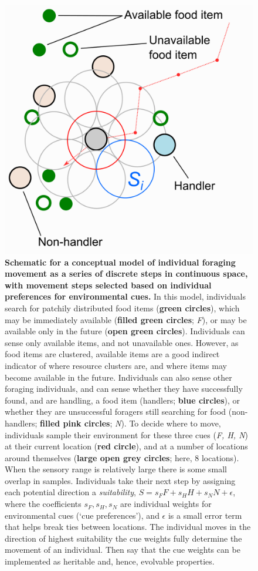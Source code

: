 \begin{interludeenv}
\begin{figure}[!h]
    \centering
    \includegraphics[width=0.9\linewidth]{figures/introduction/fig_schematic.png}
    \caption{
        \textbf{Schematic for a conceptual model of individual foraging movement as a series of discrete steps in continuous space, with movement steps selected based on individual preferences for environmental cues.} 
        In this model, individuals search for patchily distributed food items (\textbf{green circles}), which may be immediately available (\textbf{filled green circles}; \emph{F}), or may be available only in the future (\textbf{open green circles}). 
        Individuals can sense only available items, and not unavailable ones. However, as food items are clustered, available items are a good indirect indicator of where resource clusters are, and where items may become available in the future. 
        Individuals can also sense other foraging individuals, and can sense whether they have successfully found, and are handling, a food item (handlers; \textbf{blue circles}), or whether they are unsuccessful foragers still searching for food (non-handlers; \textbf{filled pink circles}; \emph{N}). 
        To decide where to move, individuals sample their environment for these three cues (\emph{F, H, N}) at their current location (\textbf{red circle}), and at a number of locations around themselves (\textbf{large open grey circles}; here, 8 locations). 
        When the sensory range is relatively large there is some small overlap in samples. 
        Individuals take their next step by assigning each potential direction a \emph{suitability}, $S = s_FF + s_HH + s_NN + \epsilon$, where the coefficients $s_F, s_H, s_N$ are individual weights for environmental cues (`cue preferences'), and $\epsilon$ is a small error term that helps break ties between locations.
        The individual moves in the direction of highest suitability the cue weights fully determine the movement of an individual. Then say that the cue weights can be implemented as heritable and, hence, evolvable properties.
    }
    \label{fig:demo_schematic}
  \end{figure}


\end{interludeenv}
